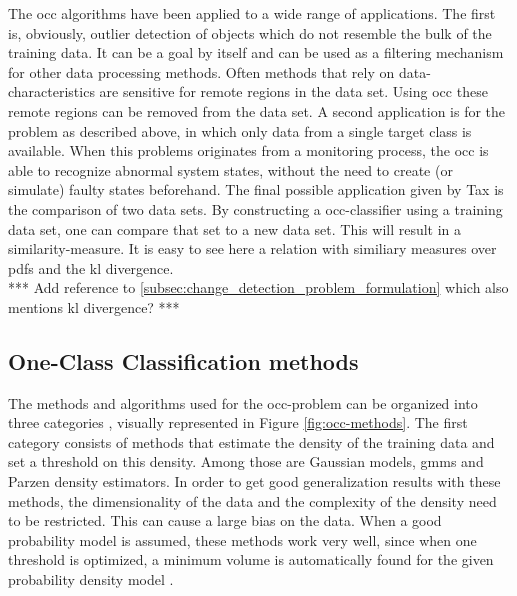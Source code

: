The \gls{occ} algorithms have been applied to a wide range of applications.
The first is, obviously, outlier detection of objects which do not resemble the bulk of the training data.
It can be a goal by itself and can be used as a filtering mechanism for other data processing methods.
Often methods that rely on data-characteristics are sensitive for remote regions in the data set.
Using \gls{occ} these remote regions can be removed from the data set.
A second application is for the problem as described above, in which only data from a single target class is available.
When this problems originates from \eg a monitoring process, the \gls{occ} is able to recognize abnormal system states, without the need to create (or simulate) faulty states beforehand.
The final possible application given by Tax \cite{tax2001one} is the comparison of two data sets.
By constructing a \gls{occ}-classifier using a training data set, one can compare that set to a new data set.
This will result in a similarity-measure.
It is easy to see here a relation with similiary measures over \glspl{pdf} and the \gls{kl} divergence. \\
*** Add reference to \ref{subsec:change_detection_problem_formulation} which also mentions \gls{kl} divergence? ***

\subsection{One-Class Classification methods}\label{subsec:occ-methods}
The methods and algorithms used for the \gls{occ}-problem can be organized into three categories \cite{tax2001one,noumir2012simple}, visually represented in Figure \ref{fig:occ-methods}.
The first category consists of methods that estimate the density of the training data and set a threshold on this density.
Among those are Gaussian models, \glspl{gmm} and Parzen density estimators.
In order to get good generalization results with these methods, the dimensionality of the data and the complexity of the density need to be restricted.
This can cause a large bias on the data.
When a good probability model is assumed, these methods work very well, since when one threshold is optimized, a minimum volume is automatically found for the given probability density model \cite{tax2001one}.

